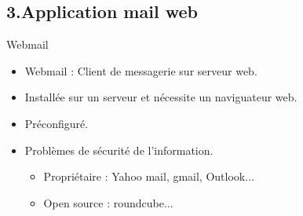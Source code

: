 \documentclass{beamer}
\begin{document}
    \subsection{3.Application mail web}
        \begin{frame}
        \begin{block}{Webmail}
            \begin{itemize}
                \item {
                Webmail : Client de messagerie sur serveur web.\\
                }
                \item {
                    Installée sur un serveur et nécessite un naviguateur web.
                }            
                \item {
                Préconfiguré.
                }
                \item {
                Problèmes de sécurité de l'information.
                }
                \begin{itemize}
                    \item Propriétaire : Yahoo mail, gmail, Outlook...
                    \item Open source : roundcube...
                \end{itemize}
            \end{itemize}
            \end{block}
        \end{frame}



\end{document}

